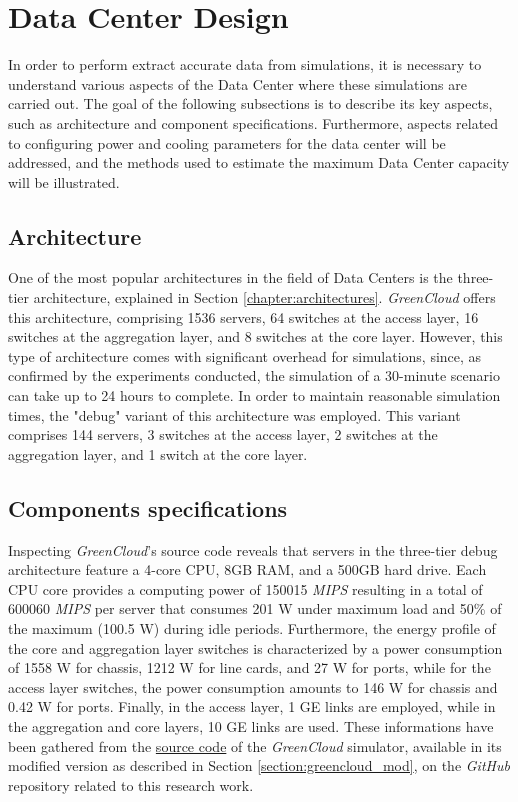  

\section{Data Center Design}
In order to perform extract accurate data from simulations, it is necessary to understand various aspects of the Data Center where these simulations are carried out. The goal of the following subsections is to describe its key aspects, such as architecture and component specifications. Furthermore, aspects related to configuring power and cooling parameters for the data center will be addressed, and the methods used to estimate the maximum Data Center capacity will be illustrated.

\subsection{Architecture}
One of the most popular architectures in the field of Data Centers is the three-tier architecture, explained in Section \ref{chapter:architectures}. \emph{GreenCloud} offers this architecture, comprising 1536 servers, 64 switches at the access layer, 16 switches at the aggregation layer, and 8 switches at the core layer. However, this type of architecture comes with significant overhead for simulations, since, as confirmed by the experiments conducted, the simulation of a 30-minute scenario can take up to 24 hours to complete. In order to maintain reasonable simulation times, the "debug" variant of this architecture was employed. This variant comprises 144 servers, 3 switches at the access layer, 2 switches at the aggregation layer, and 1 switch at the core layer. 

\subsection{Components specifications} \label{subsection:components_spec}
Inspecting \emph{GreenCloud}'s source code reveals that servers in the three-tier debug architecture feature a 4-core CPU, 8GB RAM, and a 500GB hard drive. Each CPU core provides a computing power of 150015 \emph{MIPS} resulting in a total of 600060 \emph{MIPS} per server that consumes 201 W under maximum load and 50\% of the maximum (100.5 W) during idle periods. Furthermore, the energy profile of the core and aggregation layer switches is characterized by a power consumption of 1558 W for chassis, 1212 W for line cards, and 27 W for ports, while for the access layer switches, the power consumption amounts to 146 W for chassis and 0.42 W for ports. Finally, in the access layer, 1 GE links are employed, while in the aggregation and core layers, 10 GE links are used. These informations have been gathered from the \href{https://github.com/vincenzo-emanuele/masters-degree-thesis/tree/main/greencloud_modified_src}{source code} of the \emph{GreenCloud} simulator, available in its modified version as described in Section \ref{section:greencloud_mod}, on the \emph{GitHub} repository related to this research work. 

